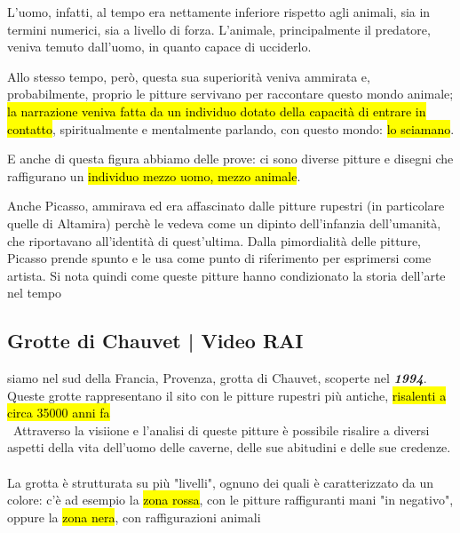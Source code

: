     L'uomo, infatti, al tempo era nettamente inferiore rispetto agli animali, sia in termini numerici, sia a livello di forza. L'animale, principalmente il predatore, veniva temuto dall'uomo, in quanto capace di ucciderlo.

    Allo stesso tempo, però, questa sua superiorità veniva ammirata e, probabilmente, proprio le pitture servivano per raccontare questo mondo animale; \hl{la narrazione veniva fatta da un individuo dotato della capacità di entrare in contatto}, spiritualmente e mentalmente parlando, con questo mondo: \hl{lo sciamano}.

    E anche di questa figura abbiamo delle prove: ci sono diverse pitture e disegni che raffigurano un \hl{individuo mezzo uomo, mezzo animale}.
\begin{mdframed}[style=mystyle,frametitle=Curiosità]
     Anche Picasso, ammirava ed era affascinato dalle pitture rupestri (in particolare quelle di Altamira) perchè le vedeva come un dipinto dell'infanzia dell'umanità, che riportavano all'identità di quest'ultima. Dalla pimordialità delle pitture, Picasso prende spunto e le usa come punto di riferimento per esprimersi come artista. Si nota quindi come queste pitture hanno condizionato la storia dell'arte nel tempo
    \end{mdframed}

    \subsection{Grotte di Chauvet | Video RAI}
    siamo nel sud della Francia, Provenza, grotta di Chauvet, scoperte nel \textbf{\textit{1994}}. Queste grotte rappresentano il sito con le pitture rupestri più antiche, \hl{risalenti a circa 35000 anni fa}
\\\ Attraverso la visiione e l'analisi di queste pitture è possibile risalire a diversi aspetti della vita dell'uomo delle caverne, delle sue abitudini e delle sue credenze.
\\\\La grotta è strutturata su più "livelli", ognuno dei quali è caratterizzato da un colore: c'è ad esempio la \hl{zona rossa}, con le pitture raffiguranti mani "in negativo", oppure la \hl{zona nera}, con raffigurazioni animali
